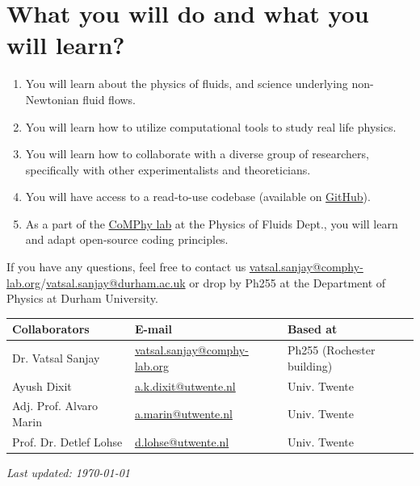 \documentclass[11pt]{article}
\begin{document}
\section*{What you will do and what you will learn?}
\begin{enumerate}
\item You will learn about the physics of fluids, and science underlying non-Newtonian fluid flows. 
\item You will learn how to utilize computational tools to study real life physics. 
\item You will learn how to collaborate with a diverse group of researchers, specifically with other experimentalists and theoreticians.
\item You will have access to a read-to-use codebase (available on \href{https://github.com/comphy-lab/Viscoelastic-Worthington-jets-and-droplets-produced-by-bursting-bubbles}{GitHub}).
\item As a part of the \href{https://comphy-lab.org}{CoMPhy lab} at the Physics of Fluids Dept., you will learn and adapt open-source coding principles. 

\end{enumerate}

If you have any questions, feel free to contact us \href{mailto:vatsal.sanjay@comphy-lab.org}{vatsal.sanjay@comphy-lab.org}/\href{mailto:vatsal.sanjay@durham.ac.uk}{vatsal.sanjay@durham.ac.uk} or drop by Ph255 at the Department of Physics at Durham University.
\begin{center}
\begin{tabular}{|l|l|l|}
\hline \textbf{Collaborators} & \textbf{E-mail} & \textbf{Based at} \\
\hline Dr. Vatsal Sanjay & \href{mailto:vatsal.sanjay@comphy-lab.org}{vatsal.sanjay@comphy-lab.org} & Ph255 (Rochester building) \\
\hline Ayush Dixit & \href{mailto:a.k.dixit@utwente.nl}{a.k.dixit@utwente.nl} & Univ. Twente \\
\hline Adj. Prof. Alvaro Marin & \href{mailto:a.marin@utwente.nl}{a.marin@utwente.nl} & Univ. Twente \\
\hline Prof. Dr. Detlef Lohse & \href{mailto:d.lohse@utwente.nl}{d.lohse@utwente.nl} & Univ. Twente  \\
\hline
\end{tabular}
\end{center}

\vspace{1em}
\noindent\textit{Last updated: \today}

\printbibliography
\end{document}

